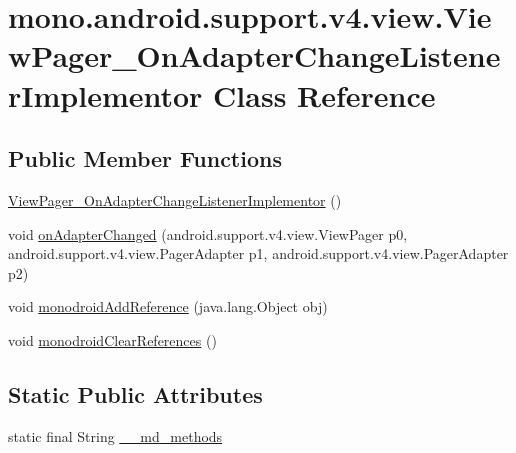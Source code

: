 \hypertarget{classmono_1_1android_1_1support_1_1v4_1_1view_1_1_view_pager___on_adapter_change_listener_implementor}{
\section{mono.android.support.v4.view.ViewPager\_\-OnAdapterChangeListenerImplementor Class Reference}
\label{classmono_1_1android_1_1support_1_1v4_1_1view_1_1_view_pager___on_adapter_change_listener_implementor}
}
\subsection*{Public Member Functions}
\begin{CompactItemize}
\item 
\hyperlink{classmono_1_1android_1_1support_1_1v4_1_1view_1_1_view_pager___on_adapter_change_listener_implementor_f64771108acd41e113ce5d23a765687d}{ViewPager\_\-OnAdapterChangeListenerImplementor} ()
\item 
void \hyperlink{classmono_1_1android_1_1support_1_1v4_1_1view_1_1_view_pager___on_adapter_change_listener_implementor_a7fc7de992a40dc7b7225b610a738b88}{onAdapterChanged} (android.support.v4.view.ViewPager p0, android.support.v4.view.PagerAdapter p1, android.support.v4.view.PagerAdapter p2)
\item 
void \hyperlink{classmono_1_1android_1_1support_1_1v4_1_1view_1_1_view_pager___on_adapter_change_listener_implementor_d7259d1363b7e277b5f5737d2b16b05a}{monodroidAddReference} (java.lang.Object obj)
\item 
void \hyperlink{classmono_1_1android_1_1support_1_1v4_1_1view_1_1_view_pager___on_adapter_change_listener_implementor_dd7cb4630bc0f072ba6327ad7f8690c8}{monodroidClearReferences} ()
\end{CompactItemize}
\subsection*{Static Public Attributes}
\begin{CompactItemize}
\item 
static final String \hyperlink{classmono_1_1android_1_1support_1_1v4_1_1view_1_1_view_pager___on_adapter_change_listener_implementor_4159f6e0c54d8a9a269b8b2624c37a5a}{\_\-\_\-md\_\-methods}
\end{CompactItemize}
